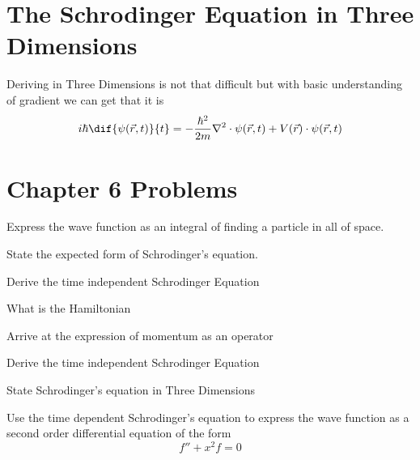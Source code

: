 \section{The Schrodinger Equation in Three Dimensions}
	Deriving in Three Dimensions is not that difficult but with basic understanding of gradient we can get that it is 
\[ i \hbar \dif{\psi(\vec{r}, t)}{t} = -\frac{\hbar^2}{2m} \nabla^2 \cdot \psi(\vec{r}, t) + V(\vec{r}) \cdot \psi(\vec{r}, t) \]
\section{Chapter 6 Problems}
	\begin{q}
	Express the wave function as an integral of finding a particle in all of space.
\end{q}
\begin{q}
	State the expected form of Schrodinger's equation.
\end{q}
\begin{q}
	Derive the time independent Schrodinger Equation
\end{q}
\begin{q}
	What is the Hamiltonian
\end{q}
\begin{q}
	Arrive at the expression of momentum as an operator
\end{q}
\begin{q}
	Derive the time independent Schrodinger Equation
\end{q}
\begin{q}
	State Schrodinger's equation in Three Dimensions
\end{q}
\begin{q}
	Use the time dependent Schrodinger's equation to express the wave function as a second order differential equation of the form 
	\[ f'' + x^2f = 0 \]
\end{q}
